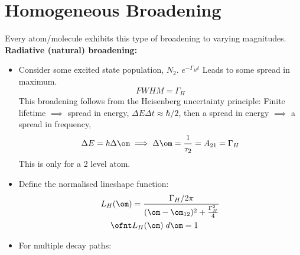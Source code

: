 \documentclass[a4paper, 11pt, normalem]{report}
\begin{document}
\section{Homogeneous Broadening}
Every atom/molecule exhibits this type of broadening to varying magnitudes.\\
\textbf{Radiative (natural) broadening:}
\begin{itemize}
    \item Consider some excited state population, $N_2$. $e^{-\Gamma_Ht}$
        Leads to some spread in maximum.
        \begin{equation}
            FWHM = \Gamma_H
        \end{equation}
        This broadening follows from the Heisenberg uncertainty principle: Finite lifetime $\implies$ spread in energy, $\Delta E\Delta t \approx \hbar/2$, then a spread in energy $\implies$ a spread in frequency,
        \begin{equation}
            \Delta E = \hbar\Delta\om \implies \Delta\om = \frac{1}{\tau_2} = A_{21} = \Gamma_H
        \end{equation}
        This is only for a 2 level atom.
        \begin{figure}[H]
            \centering 
        \end{figure}
    \item Define the normalised lineshape function:
        \begin{align}
            L_H(\om) &= \frac{\Gamma_H/2\pi}{(\om-\om_{12})^2+\frac{\Gamma_H^2}{4}} \\
            \ofnt &L_H(\om)\;d\om = 1
        \end{align}
    \item For multiple decay paths: 
        \begin{multicols}{2}
        \begin{figure}[H]
            \centering
\end{figure}
\end{multicols}
\end{itemize}
\end{document}
